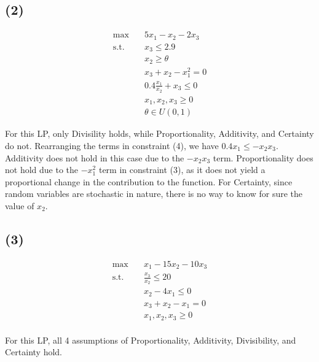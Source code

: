 \documentclass[12pt]{article}
\begin{document}
\subsection*{(2)}

\begin{align*}
    \max \quad & 5x_{1} - x_{2} - 2 x_{3} \\ 
    \text{s.t.} \quad & x_{3} \leq 2.9 \\ 
    & x_{2} \geq \theta \\ 
    & x_{3} + x_{2} - x_{1}^{2} = 0 \\ 
    & 0.4 \frac{x_{1}}{x_{2}} + x_{3} \leq  0 \\ 
    & x_{1}, x_{2}, x_{3} \geq 0 \\ 
    & \theta \in U(0,1)
\end{align*}

\noindent For this LP, only Divisility holds, while Proportionality, Additivity, and Certainty do not. Rearranging the terms in constraint (4), we have $0.4 x_1 \leq -x_2 x_3$. Additivity does not hold in this case due to the $-x_2 x_3$ term. Proportionality does not hold due to the $-x_1^2$ term in constraint (3), as it does not yield a proportional change in the contribution to the function. For Certainty, since random variables are stochastic in nature, there is no way to know for sure the value of $x_2$. 

\subsection*{(3)}


\begin{align*}
    \max \quad & x_{1} - 15x_{2} - 10 x_{3} \\ 
    \text{s.t.} \quad & \frac{x_{3}}{x_{2}} \leq 20 \\ 
    & x_{2} - 4 x_{1} \leq 0 \\ 
    & x_{3} + x_{2} - x_{1} = 0 \\ 
    & x_{1}, x_{2}, x_{3} \geq 0 \\ 
\end{align*}

\noindent For this LP, all 4 assumptions of Proportionality, Additivity, Divisibility, and Certainty hold. 
\end{document}

